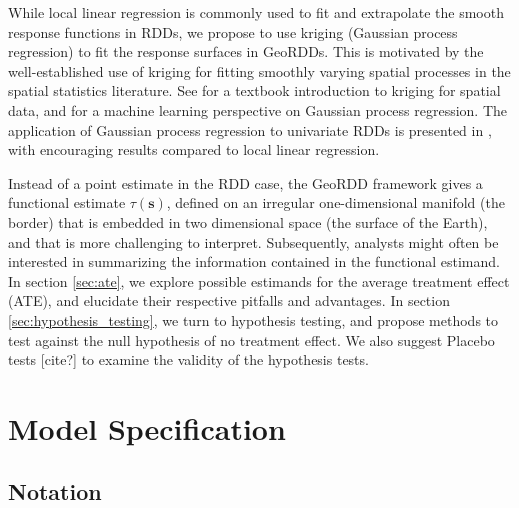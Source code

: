 \documentclass[letter]{article}
\newcommand{\svec}{\mathbold{s}}
\renewcommand{\cite}[1]{\citep{#1}}
\begin{document}
    	While local linear regression is commonly used to fit and extrapolate the smooth response functions in RDDs, we propose to use kriging (Gaussian process regression) to fit the response surfaces in GeoRDDs.
This is motivated by the well-established use of kriging for fitting smoothly varying spatial processes in the spatial statistics literature.
See \cite{banerjee2014hierarchical} for a textbook introduction to kriging for spatial data, and \cite{rasmussen2006gaussian} for a machine learning perspective on Gaussian process regression.
The application of Gaussian process regression to univariate RDDs is presented in \cite{Branson:2017qy}, with encouraging results compared to local linear regression.
    


    	Instead of a point estimate in the RDD case, the GeoRDD framework gives a functional estimate \(\tau(\svec)\), defined on an irregular one-dimensional manifold (the border) that is embedded in two dimensional space (the surface of the Earth), and that is more challenging to interpret.
Subsequently, analysts might often be interested in summarizing the information contained in the functional estimand.
In section \ref{sec:ate}, we explore possible estimands for the average treatment effect (ATE), and elucidate their respective pitfalls and advantages.
In section \ref{sec:hypothesis_testing}, we turn to hypothesis testing, and propose methods to test against the null hypothesis of no treatment effect.
We also suggest Placebo tests {[}cite?{]} to examine the validity of the hypothesis tests.
    


    	\section{Model Specification}\label{model-specification}

\subsection{Notation}\label{notation}
\end{document}
